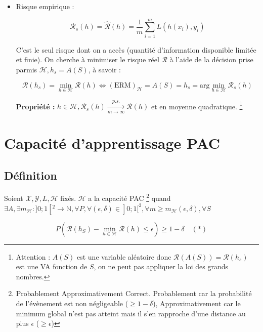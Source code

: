 \begin{itemize}
\item Risque empirique :

\begin{equation}
    \mathcal{R}_s(h) = \hat{\mathcal{R}}(h) = \frac{1}{m} \sum_{i=1}^{m} L(h(x_i), y_i)
\end{equation}


\newpage

\noindent C'est le seul risque dont on a accès (quantité d'information disponible limitée et finie). On cherche à minimiser 
le risque réel $\mathcal{R}$ à l'aide de la décision prise parmis $\mathcal{H}, h_s = A(S)$, à savoir :

\begin{equation}
    \mathcal{R}(h_s) = \min_{h \in \mathcal{H}}\mathcal{R}(h) \Longleftrightarrow 
    (\text{ERM})_{\mathcal{H}}  = A(S) = h_s = \text{arg}\min_{h \in \mathcal{H}} \mathcal{R}_s(h)
\end{equation}

\noindent \textbf{Propriété :} $h \in \mathcal{H}, \mathcal{R}_s(h) \xrightarrow[m \to \infty]{p.s.} \mathcal{R}(h)$ et en moyenne quadratique. 
\footnote{Attention : $A(S)$ est une variable aléatoire donc $\mathcal{R}(A(S)) = \mathcal{R}(h_s)$ est une VA fonction de $S$, on ne peut pas appliquer la loi des grands nombres.}

\end{itemize}

\section{Capacité d'apprentissage PAC}
\subsection{Définition}

\noindent Soient $\mathcal{X}, \mathcal{Y}, L, \mathcal{H}$ fixés. $\mathcal{H}$ a la capacité PAC 
 \footnote{Probablement Approximativement Correct. Probablement car la probabilité de l'évènement est non négligeable ($\geq 1 - \delta$),
 Approximativement car le minimum global n'est pas atteint mais il s'en rapproche d'une distance au plus $\epsilon$ ($\geq \epsilon$)}
quand $\exists A, \exists m_{\mathcal{H}} : ]0;1[^{2} \to \mathbb{N}, \forall P, \forall (\epsilon, \delta) \in  ]0;1[^{2}, 
\forall m \ge m_{\mathcal{H}}(\epsilon, \delta), \forall S$

\begin{equation}
    P(\mathcal{R}(h_S) - \min_{h \in \mathcal{H}}\mathcal{R}(h) \leq \epsilon) \geq 1 - \delta \quad (*) \nonumber
\end{equation}

